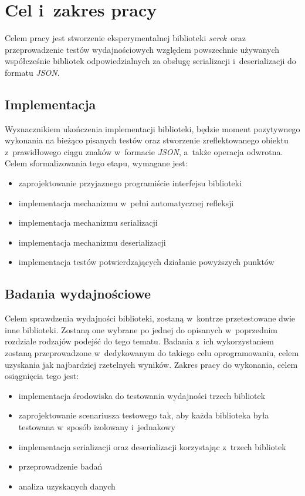 \documentclass[12pt]{article}
\newcommand{\nonpl}[1]{{\it #1}}
\newcommand{\JSON}{\nonpl{JSON}}
\newcommand{\serek}{\nonpl{serek}}
\begin{document}
	{
		\section{Cel i~zakres pracy}

		Celem pracy jest stworzenie eksperymentalnej biblioteki \serek~oraz przeprowadzenie testów wydajnościowych względem powszechnie
		używanych współcześnie bibliotek odpowiedzialnych za obsługę serializacji i~deserializacji do formatu \JSON.

		{
			\subsection{Implementacja}

			Wyznacznikiem ukończenia implementacji biblioteki, będzie moment pozytywnego wykonania na bieżąco pisanych testów oraz stworzenie zreflektowanego obiektu z~prawidłowego
			ciągu znaków w~formacie \JSON, a~także operacja odwrotna. Celem sformalizowania tego etapu, wymagane jest:

			\begin{itemize}
				\setlength\itemsep{-2mm}
				\item zaprojektowanie przyjaznego programiście interfejsu biblioteki
				\item implementacja mechanizmu w~pełni automatycznej refleksji
				\item implementacja mechanizmu serializacji
				\item implementacja mechanizmu deserializacji
				\item implementacja testów potwierdzających działanie powyższych punktów
			\end{itemize}
		}

		{
			\subsection{Badania wydajnościowe}

			Celem sprawdzenia wydajności biblioteki, zostaną w~kontrze przetestowane dwie inne biblioteki. Zostaną one wybrane po jednej do opisanych w~poprzednim rozdziale
			rodzajów podejść do tego tematu. Badania z~ich wykorzystaniem zostaną przeprowadzone w~dedykowanym do takiego celu oprogramowaniu, celem uzyskania jak najbardziej
			rzetelnych wyników. Zakres pracy do wykonania, celem osiągnięcia tego jest:

			\begin{itemize}
				\setlength\itemsep{-2mm}
				\item implementacja środowiska do testowania wydajności trzech bibliotek
				\item zaprojektowanie scenariusza testowego tak, aby każda biblioteka była testowana w~sposób izolowany i~jednakowy
				\item implementacja serializacji oraz deserializacji korzystając z~trzech bibliotek
				\item przeprowadzenie badań
				\item analiza uzyskanych danych
			\end{itemize}
		}

	}
\end{document}

